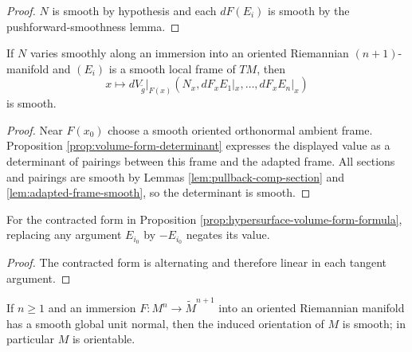 \begin{proof}
\leanok
{}
\sketch $N$ is smooth by hypothesis and each $dF(E_i)$ is smooth by the pushforward-smoothness lemma.
\end{proof}

\begin{lemma}
\label{lem:normal-restrict-frame-smooth}
\leanok
{}
If $N$ varies smoothly along an immersion into an oriented Riemannian $(n+1)$-manifold and $(E_i)$ is a smooth local frame of $TM$, then
\[
x\mapsto dV_{\widetilde g}|_{F(x)}(N_x,dF_xE_1|_x,\ldots,dF_xE_n|_x)
\]
is smooth.
\end{lemma}

\begin{proof}
\leanok
{}
\sketch Near $F(x_0)$ choose a smooth oriented orthonormal ambient frame. Proposition \ref{prop:volume-form-determinant} expresses the displayed value as a determinant of pairings between this frame and the adapted frame. All sections and pairings are smooth by Lemmas \ref{lem:pullback-comp-section} and \ref{lem:adapted-frame-smooth}, so the determinant is smooth.
\end{proof}

\begin{lemma}
\label{lem:normal-restrict-neg-member}
\leanok
{}
For the contracted form in Proposition \ref{prop:hypersurface-volume-form-formula}, replacing any argument $E_{i_0}$ by $-E_{i_0}$ negates its value.
\end{lemma}

\begin{proof}
\leanok
\sketch The contracted form is alternating and therefore linear in each tangent argument.
\end{proof}

\begin{proposition}
\label{prop:hypersurface-orientable-of-normal}
\leanok
{}
If $n\ge1$ and an immersion $F:M^n\to\widetilde M^{n+1}$ into an oriented Riemannian manifold has a smooth global unit normal, then the induced orientation of $M$ is smooth; in particular $M$ is orientable.
\end{proposition}

